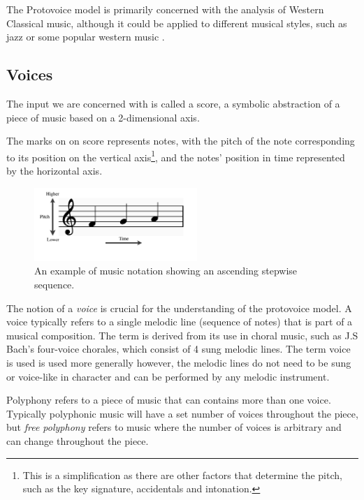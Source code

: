 \documentclass[12pt,a4paper,twoside,openright]{report}
\theoremstyle{definition}
\begin{document}
The Protovoice model is primarily concerned with the analysis of Western Classical music, although it could be applied to different musical styles, such as jazz or some popular western music \cite{finkensiepStructureFreePolyphony2023}. 

\subsection{Voices}

\par
The input we are concerned with is called a score, a symbolic abstraction of a piece of music based on a 2-dimensional axis.

The marks on on score represents notes, with the pitch of the note corresponding to its position on the vertical axis\footnote{This is a simplification as there are other factors that determine the pitch, such as the key signature, accidentals and intonation.}, and the notes' position in time represented by the horizontal axis.
\begin{figure}
  \centering
  \includegraphics[width=0.55\textwidth]{prep/pitchTime.png}
  \captionsetup{width=.9\linewidth}
  \caption{An example of music notation showing an ascending stepwise sequence.}
  \label{fig:pitchTime}
\end{figure}

The notion of a \textit{voice} is crucial for the understanding of the protovoice model.
A voice typically refers to a single melodic line (sequence of notes) that is part of a musical composition.
The term is derived from its use in choral music, such as J.S Bach's four-voice chorales, which consist of 4 sung melodic lines.
The term voice is used is used more generally however, the melodic lines do not need to be sung or voice-like in character and can be performed by any melodic instrument. 

Polyphony refers to a piece of music that can contains more than one voice.
Typically polyphonic music will have a set number of voices throughout the piece, but \textit{free polyphony} refers to music where the number of voices is arbitrary and can change throughout the piece.
\end{document}
